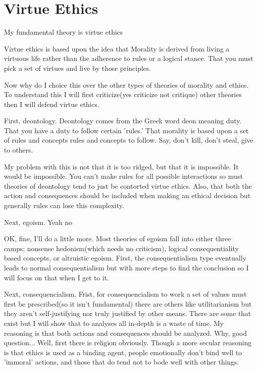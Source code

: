 \section{Virtue Ethics}
\par My fundamental theory is virtue ethics
\par Virtue ethics is based upon the idea that Morality is derived from living a virtuous life rather than the adherence to rules or a logical stance. That you must pick a set of virtues and live by those principles.
\par Now why do I choice this over the other types of theories of morality and ethics. To understand this I will first criticize(yes criticize not critique) other theories then I will defend virtue ethics.
\par First, deontology. Deontology comes from the Greek word deon meaning duty. That you have a duty to follow certain 'rules.' That morality is based upon a set of rules and concepts rules and concepts to follow. Say, don't kill, don't steal, give to others.
\par My problem with this is not that it is too ridged, but that it is impossible. It would be impossible. You can't make rules for all possible interactions so must theories of deontology tend to just be contorted virtue ethics. Also, that both the action and consequences should be included when making an ethical decision but generally rules can lose this complexity.
\par Next, egoism. Yeah no
\par OK, fine, I'll do a little more. Most theories of egoism fall into either three camps; nonsense hedonism(which needs no criticism), logical consequentiality based concepts, or altruistic egoism. First, the consequentialism type eventually leads to normal consequentialism but with more steps to find the conclusion so I will focus on that when I get to it.
\par Next, consequencialism. Frist, for consequencialism to work a set of values must first be prescribed(so it isn't fundamental) there are others like utilitarianism but they aren't self-justifying nor truly justified by other means. There are some that exist but I will show that to analyses all in-depth is a waste of time. My reasoning is that both actions and consequences should be analyzed. Why, good question... Well, first there is religion obviously. Though a more secular reasoning is that ethics is used as a binding agent, people emotionally don't bind well to 'immoral' actions, and those that do tend not to bode well with other things.
